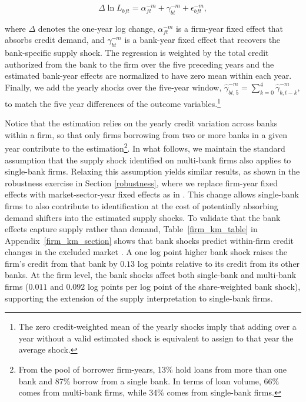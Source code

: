 \documentclass[12pt]{article}
\begin{document}
\begin{equation} \label{fe}
    \Delta \ln L_{bft} = \alpha_{ft}^{-m} + \gamma_{bt}^{-m} + \epsilon_{bft}^{-m},
\end{equation}

where $\Delta$ denotes the one-year log change, $\alpha_{ft}^{-m}$ is a firm-year fixed effect that absorbs credit demand, and $\gamma_{bt}^{-m}$ is a bank-year fixed effect that recovers the bank-specific supply shock.
The regression is weighted by the total credit authorized from the bank to the firm over the five preceding years and the estimated bank-year effects are normalized to have zero mean within each year. Finally, we add the yearly shocks over the five-year window, $\hat{\gamma}_{bt,5}^{-m} = \sum_{k=0}^{4} \hat{\gamma}_{b,t-k}^{-m}$, to match the five year differences of the outcome variables.\footnote{The zero credit-weighted mean of the yearly shocks imply that adding over a year without a valid estimated shock is equivalent to assign to that year the average shock.}

Notice that the estimation relies on the yearly credit variation across banks within a firm, so that only firms borrowing from two or more banks in a given year contribute to the estimation\footnote{From the pool of borrower firm-years, 13\% hold loans from more than one bank and 87\% borrow from a single bank. In terms of loan volume, 66\% comes from multi-bank firms, while 34\% comes from single-bank firms.}. In what follows, we maintain the standard assumption that the supply shock identified on multi-bank firms also applies to single-bank firms. Relaxing this assumption yields similar results, as shown in the robustness exercise in Section \ref{robustness}, where we replace firm-year fixed effects with market-sector-year fixed effects as in \citet{degryse2019identifying}. This change allows single-bank firms to also contribute to identification at the cost of potentially absorbing demand shifters into the estimated supply shocks. To validate that the bank effects capture supply rather than demand, Table~\ref{firm_km_table} in Appendix~\ref{firm_km_section} shows that bank shocks predict within-firm credit changes in the excluded market \citep{khwaja2008tracing}. A one log point higher bank shock raises the firm's credit from that bank by $0.13$ log points relative to its credit from its other banks. At the firm level, the bank shocks affect both single-bank and multi-bank firms ($0.011$ and $0.092$ log points per log point of the share-weighted bank shock), supporting the extension of the supply interpretation to single-bank firms.
\end{document}
